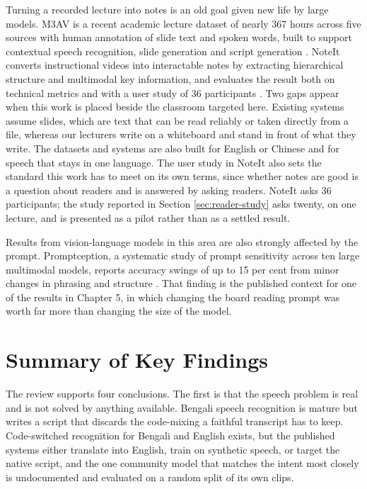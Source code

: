 Turning a recorded lecture into notes is an old goal given new life by large models. M3AV
is a recent academic lecture dataset of nearly 367 hours across five sources with human
annotation of slide text and spoken words, built to support contextual speech
recognition, slide generation and script generation \cite{chen2024m3av}. NoteIt converts
instructional videos into interactable notes by extracting hierarchical structure and
multimodal key information, and evaluates the result both on technical metrics and with a
user study of 36 participants \cite{zhao2025noteit}. Two gaps appear when this work is
placed beside the classroom targeted here. Existing systems assume slides, which are text
that can be read reliably or taken directly from a file, whereas our lecturers write on a
whiteboard and stand in front of what they write. The datasets and systems are also built
for English or Chinese and for speech that stays in one language. The user study in
NoteIt also sets the standard this work has to meet on its own terms, since whether notes
are good is a question about readers and is answered by asking readers. NoteIt asks 36
participants; the study reported in Section \ref{sec:reader-study} asks twenty, on one
lecture, and is presented as a pilot rather than as a settled result.

Results from vision-language models in this area are also strongly affected by the
prompt. Promptception, a systematic study of prompt sensitivity across ten large
multimodal models, reports accuracy swings of up to 15 per cent from minor changes in
phrasing and structure \cite{ismithdeen2025promptception}. That finding is the published
context for one of the results in Chapter 5, in which changing the board reading prompt
was worth far more than changing the size of the model.

\section{Summary of Key Findings}

The review supports four conclusions. The first is that the speech problem is real and is
not solved by anything available. Bengali speech
recognition is mature but writes a script that discards the code-mixing a faithful
transcript has to keep. Code-switched
recognition for Bengali and English exists, but the published systems either translate
into English, train on synthetic speech, or target the native script, and the one
community model that matches the intent most closely is undocumented and evaluated on a
random split of its own clips.

